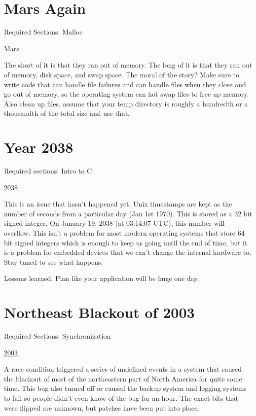 \section{Mars Again}
\label{pm:mars_memory}

Required Sections: Malloc

\href{https://www.computerworld.com/article/2574759/data-storage-solutions/out-of-memory-problem-caused-mars-rover-s-glitch.html}{Mars}

The short of it is that they ran out of memory. The long of it is that they ran out of memory, disk space, and swap space. The moral of the story? Make sure to write code that can handle file failures and can handle files when they close and go out of memory, so the operating system can hot swap files to free up memory. Also clean up files, assume that your temp directory is roughly a hundredth or a thousandth of the total size and use that.

\section{Year 2038}
\label{pm:y2038}

Required sections: Intro to C

\href{https://en.wikipedia.org/wiki/Year_2038_problem}{2038}

This is an issue that hasn't happened yet.
Unix timestamps are kept as the number of seconds from a particular day (Jan 1st 1970).
This is stored as a 32 bit signed integer.
On January 19, 2038 (at 03:14:07 UTC), this number will overflow.
This isn't a problem for most modern operating systems that store 64 bit signed integers which is enough to keep us going until the end of time, but it is a problem for embedded devices that we can't change the internal hardware to.
Stay tuned to see what happens.

Lessons learned: Plan like your application will be huge one day.

\section{Northeast Blackout of 2003}
\label{pm:blackout2003}

Required Sections: Synchronization

\href{https://en.wikipedia.org/wiki/Northeast_blackout_of_2003}{2003}

A race condition triggered a series of undefined events in a system that caused the blackout of most of the northeastern part of North America for quite some time.
This bug also turned off or caused the backup system and logging systems to fail so people didn't even know of the bug for an hour. The exact bits that were flipped are unknown, but patches have been put into place.


